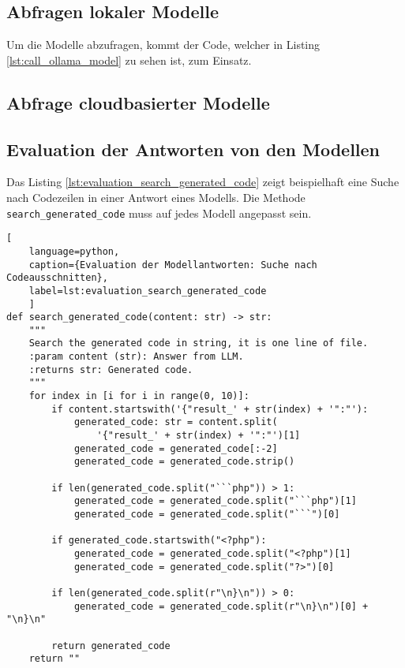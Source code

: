\subsection{Abfragen lokaler Modelle}
Um die Modelle abzufragen, kommt der Code, welcher in Listing \ref{lst:call_ollama_model} zu sehen ist, zum Einsatz.




\subsection{Abfrage cloudbasierter Modelle}






\subsection{Evaluation der Antworten von den Modellen}
Das Listing \ref{lst:evaluation_search_generated_code} zeigt beispielhaft eine Suche nach Codezeilen in einer Antwort eines Modells. Die Methode \texttt{search\_generated\_code} muss auf jedes Modell angepasst sein.

\begin{lstlisting}[
	language=python,
	caption={Evaluation der Modellantworten: Suche nach Codeausschnitten},
	label=lst:evaluation_search_generated_code
	]
def search_generated_code(content: str) -> str:
    """
    Search the generated code in string, it is one line of file.
    :param content (str): Answer from LLM.
    :returns str: Generated code.
    """
    for index in [i for i in range(0, 10)]:
        if content.startswith('{"result_' + str(index) + '":"'):
            generated_code: str = content.split(
                '{"result_' + str(index) + '":"')[1]
            generated_code = generated_code[:-2]
            generated_code = generated_code.strip()

        if len(generated_code.split("```php")) > 1:
            generated_code = generated_code.split("```php")[1]
            generated_code = generated_code.split("```")[0]

        if generated_code.startswith("<?php"):
            generated_code = generated_code.split("<?php")[1]
            generated_code = generated_code.split("?>")[0]

        if len(generated_code.split(r"\n}\n")) > 0:
            generated_code = generated_code.split(r"\n}\n")[0] + "\n}\n"

        return generated_code
    return ""
\end{lstlisting}
